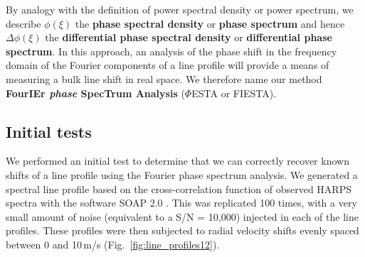 By analogy with the definition of power spectral density or power spectrum, we describe $\phi(\xi)$ the \textbf{phase spectral density} or \textbf{phase spectrum} and hence $\Delta \phi(\xi)$ the \textbf{differential phase spectral density} or \textbf{differential phase spectrum}. In this approach, an analysis of the phase shift in the frequency domain of the Fourier components of a line profile will provide a means of measuring a bulk line shift in real space. We therefore name our method \textbf{FourIEr \textit{phase} SpecTrum Analysis} ($\mathit{\Phi}$ESTA or FIESTA). 



\subsection{Initial tests}
\label{sec:Initial_tests}

We performed an initial test to determine that we can correctly recover known shifts of a line profile using the Fourier phase spectrum analysis. We generated a spectral line profile based on the cross-correlation function of observed HARPS spectra with the software SOAP 2.0 \cite{Dumusque2014SOAP}. This was replicated 100 times, with a very small amount of 
noise (equivalent to a S/N = 10,000) injected in each of the line profiles. These profiles were then
subjected to radial velocity shifts evenly spaced between 0 and 10\,m/s (Fig.~\ref{fig:line_profiles12}). 

